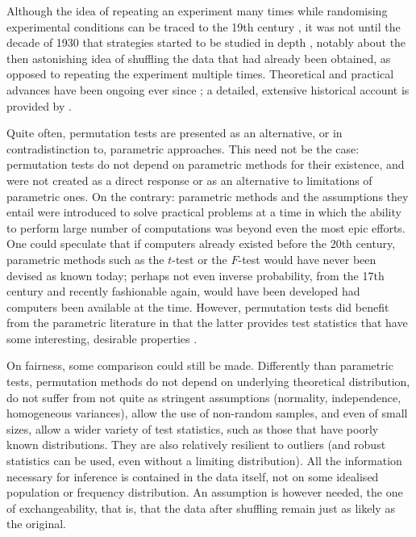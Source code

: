 Although the idea of repeating an experiment many times while randomising experimental conditions can be traced to the 19th century \citep{Peirce1884}, it was not until the decade of 1930 that strategies started to be studied in depth \citep{Fisher1935, Pitman1937-I, Pitman1937-II, Pitman1938}, notably about the then astonishing idea of shuffling the data that had already been obtained, as opposed to repeating the experiment multiple times. Theoretical and practical advances have been ongoing ever since \citep{Pearson1937, Scheffe1943, Lehmann1949, Kempthorne1955, Freedman1983, Westfall1993, Edgington1995, Good2002, Good2005, Westfall2008, Pesarin2010}; a detailed, extensive historical account is provided by \citet{Berry2014}.

Quite often, permutation tests are presented as an alternative, or in contradistinction to, parametric approaches. This need not be the case: permutation tests do not depend on parametric methods for their existence, and were not created as a direct response or as an alternative to limitations of parametric ones. On the contrary: parametric methods and the assumptions they entail were introduced to solve practical problems at a time in which the ability to perform large number of computations was beyond even the most epic efforts. One could speculate that if computers already existed before the 20th century, parametric methods such as the $t$-test or the $F$-test would have never been devised as known today; perhaps not even inverse probability, from the 17th century and recently fashionable again, would have been developed had computers been available at the time. However, permutation tests did benefit from the parametric literature in that the latter provides test statistics that have some interesting, desirable properties \citep{Hall1991}.

On fairness, some comparison could still be made. Differently than parametric tests, permutation methods do not depend on underlying theoretical distribution, do not suffer from not quite as stringent assumptions (normality, independence, homogeneous variances), allow the use of non-random samples, and even of small sizes, allow a wider variety of test statistics, such as those that have poorly known distributions. They are also relatively resilient to outliers (and robust statistics can be used, even without a limiting distribution). All the information necessary for inference is contained in the data itself, not on some idealised population or frequency distribution. An assumption is however needed, the one of exchangeability, that is, that the data after shuffling remain just as likely as the original.

